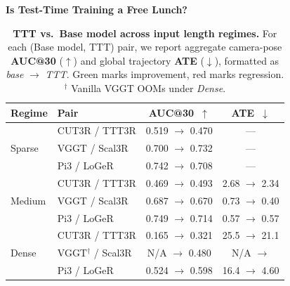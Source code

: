 
\noindent\textbf{Is Test-Time Training a Free Lunch?}


\begin{table}
\vspace{-20pt}
\centering
\caption{\textbf{TTT vs.\ Base model across input length regimes.}
For each (Base model, TTT) pair, we report aggregate camera-pose \textbf{AUC@30} ($\uparrow$) and global trajectory \textbf{ATE} ($\downarrow$), formatted as \emph{base} $\rightarrow$ \emph{TTT}. {\color{ForestGreen}Green} marks improvement, {\color{red}red} marks regression. $^{\dagger}$ Vanilla VGGT OOMs under \emph{Dense}.
}
\label{tab:ttt_length_ablation}
\footnotesize
\setlength{\tabcolsep}{4pt}
\renewcommand{\arraystretch}{1.12}
\begin{tabular}{l l c c}
\toprule
\textbf{Regime} & \textbf{Pair} & \textbf{AUC@30}~$\uparrow$ & \textbf{ATE}~$\downarrow$ \\
\midrule
\multirow{3}{*}{Sparse}
 & CUT3R / TTT3R & 0.519 $\rightarrow$ {\color{red}0.470}        & --- \\
 & VGGT / Scal3R & 0.700 $\rightarrow$ {\color{ForestGreen}0.732} & --- \\
 & Pi3 / LoGeR   & 0.742 $\rightarrow$ {\color{red}0.708}        & --- \\
\midrule
\multirow{3}{*}{Medium}
 & CUT3R / TTT3R & 0.469 $\rightarrow$ {\color{ForestGreen}0.493} & 2.68 $\rightarrow$ {\color{ForestGreen}2.34} \\
 & VGGT / Scal3R & 0.687 $\rightarrow$ {\color{red}0.670}         & 0.73 $\rightarrow$ {\color{ForestGreen}0.40} \\
 & Pi3 / LoGeR   & 0.749 $\rightarrow$ {\color{red}0.714}         & 0.57 $\rightarrow$ {\color{red}0.57} \\
\midrule
\multirow{3}{*}{Dense}
 & CUT3R / TTT3R & 0.165 $\rightarrow$ {\color{ForestGreen}0.321} & 25.5 $\rightarrow$ {\color{ForestGreen}21.1} \\
 & VGGT$^{\dagger}$ / Scal3R & N/A $\rightarrow$ {\color{ForestGreen}0.480}           & N/A $\rightarrow$ \color{ForestGreen}{2.40} \\
 & Pi3 / LoGeR   & 0.524 $\rightarrow$ {\color{ForestGreen}0.598} & 16.4 $\rightarrow$ {\color{ForestGreen}4.60} \\
\bottomrule
\end{tabular}
\vspace{-12pt}
\end{table}

